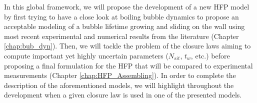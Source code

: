 In this global framework, we will propose the development of a new HFP model by first trying to have a close look at boiling bubble dynamics to propose an acceptable modeling of a bubble lifetime growing and sliding on the wall using most recent experimental and numerical results from the literature (Chapter \ref{chap:bub_dyn}). Then, we will tackle the problem of the closure laws aiming to compute important yet highly uncertain parameters ($N_{sit}$, $t_{w}$, etc.) before proposing a final formulation for the HFP that will be compared to experimental measurements (Chapter \ref{chap:HFP_Assembling}). In order to complete the description of the aforementioned models, we will highlight throughout the development when a given closure law is used in one of the presented models.
%
%
%
%
%
%
%
%
%
%

